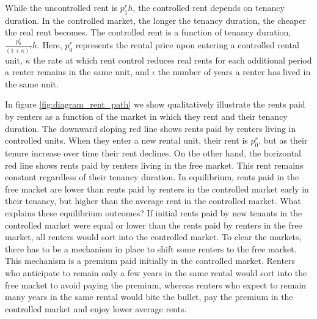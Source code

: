\documentclass[parskip=full]{article}
\begin{document}
While the uncontrolled rent is $p^{r}_{1}h$, the controlled rent depends on tenancy duration. In the controlled market, the longer the tenancy duration, the cheaper the real rent becomes. The controlled rent is a function of tenancy duration, $\frac{p^{r}_{0}}{(1+\kappa)^{\iota}} h$. Here, $p^{r}_{0}$ represents the rental price upon entering a controlled rental unit, $\kappa$ the rate at which rent control reduces real rents for each additional period a renter remains in the same unit, and $\iota$ the number of years a renter has lived in the same unit. 

In figure \ref{fig:diagram_rent_path} we show qualitatively illustrate the rents paid by renters as a function of the market in which they rent and their tenancy duration. The downward sloping red line shows rents paid by renters living in controlled units. When they enter a new rental unit, their rent is $p^{r}_{0}$, but as their tenure increase over time their rent declines. On the other hand, the horizontal red line shows rents paid by renters living in the free market. This rent remains constant regardless of their tenancy duration. In equilibrium, rents paid in the free market are lower than rents paid by renters in the controlled market early in their tenancy, but higher than the average rent in the controlled market. What explains these equilibrium outcomes? If initial rents paid by new tenants in the controlled market were equal or lower than the rents paid by renters in the free market, all renters would sort into the controlled market. To clear the markets, there has to be a mechanism in place to shift some renters to the free market. This mechanism is a premium paid initially in the controlled market. Renters who anticipate to remain only a few years in the same rental would sort into the free market to avoid paying the premium, whereas renters who expect to remain many years in the same rental would bite the bullet, pay the premium in the controlled market and enjoy lower average rents.
\end{document}
